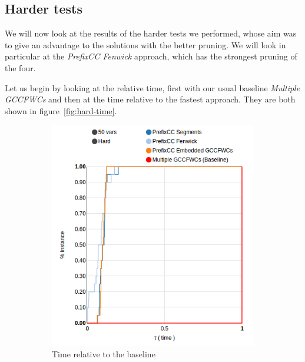 \documentclass[a4paper,10pt]{article}
\begin{document}
\subsection{Harder tests}
\label{subsec:results-hard}

We will now look at the results of the harder tests we performed, whose aim was to give an advantage to the solutions with the better pruning. We will look in particular at the \emph{PrefixCC Fenwick} approach, which has the strongest pruning of the four.

Let us begin by looking at the relative time, first with our usual baseline \emph{Multiple GCCFWCs} and then at the time relative to the fastest approach. They are both shown in figure~\ref{fig:hard-time}.

\begin{figure}
    \centering
    \begin{subfigure}[b]{0.45\textwidth}
        \includegraphics[width=\textwidth]{img/hard25-50vars-time-static}
        \caption{Time relative to the baseline}
        \label{fig:hard-time-static}
    \end{subfigure}
    \quad
    \begin{subfigure}[b]{0.45\textwidth}

\end{subfigure}
\end{figure}
\end{document}
